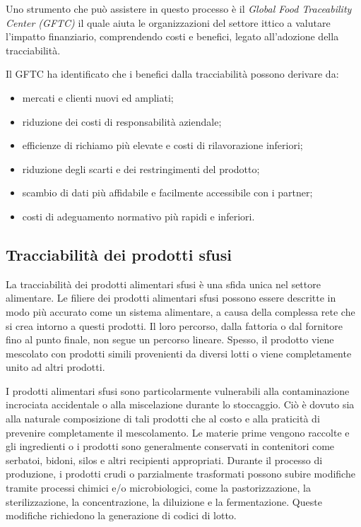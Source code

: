 Uno strumento che può assistere in questo processo è il \textit{Global Food Traceability Center (GFTC)} il quale aiuta le organizzazioni del settore ittico a valutare l'impatto finanziario, comprendendo costi e benefici, legato all'adozione della tracciabilità.

Il GFTC ha identificato che i benefici dalla tracciabilità possono derivare da:

\begin{itemize}
    \item mercati e clienti nuovi ed ampliati;
    \item riduzione dei costi di responsabilità aziendale;
    \item efficienze di richiamo più elevate e costi di rilavorazione inferiori;
    \item riduzione degli scarti e dei restringimenti del prodotto;
    \item scambio di dati più affidabile e facilmente accessibile con i partner;
    \item costi di adeguamento normativo più rapidi e inferiori.
\end{itemize}

\subsection{Tracciabilità dei prodotti sfusi}

La tracciabilità dei prodotti alimentari sfusi è una sfida unica nel settore alimentare. Le filiere dei prodotti alimentari sfusi possono essere descritte in modo più accurato come un sistema alimentare, a causa della complessa rete che si crea intorno a questi prodotti. Il loro percorso, dalla fattoria o dal fornitore fino al punto finale, non segue un percorso lineare. Spesso, il prodotto viene mescolato con prodotti simili provenienti da diversi lotti o viene completamente unito ad altri prodotti.

I prodotti alimentari sfusi sono particolarmente vulnerabili alla contaminazione incrociata accidentale o alla miscelazione durante lo stoccaggio. Ciò è dovuto sia alla naturale composizione di tali prodotti che al costo e alla praticità di prevenire completamente il mescolamento. Le materie prime vengono raccolte e gli ingredienti o i prodotti sono generalmente conservati in contenitori come serbatoi, bidoni, silos e altri recipienti appropriati. Durante il processo di produzione, i prodotti crudi o parzialmente trasformati possono subire modifiche tramite processi chimici e/o microbiologici, come la pastorizzazione, la sterilizzazione, la concentrazione, la diluizione e la fermentazione. Queste modifiche richiedono la generazione di codici di lotto.

